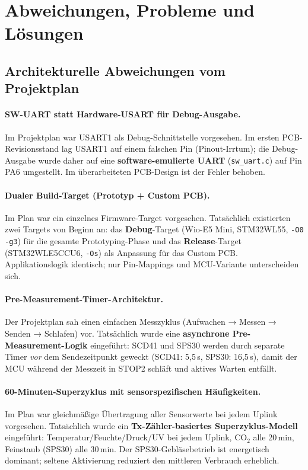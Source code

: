 \documentclass[11pt,a4paper]{scrartcl}
\begin{document}
\section{Abweichungen, Probleme und Lösungen}

\subsection*{Architekturelle Abweichungen vom Projektplan}

\paragraph{SW-UART statt Hardware-USART für Debug-Ausgabe.}
Im Projektplan war USART1 als Debug-Schnittstelle vorgesehen. Im ersten PCB-Revisionsstand lag USART1 auf einem falschen Pin (Pinout-Irrtum); die Debug-Ausgabe wurde daher auf eine \textbf{software-emulierte UART} (\texttt{sw\_uart.c}) auf Pin PA6 umgestellt. Im überarbeiteten PCB-Design ist der Fehler behoben.

\paragraph{Dualer Build-Target (Prototyp + Custom PCB).}
Im Plan war ein einzelnes Firmware-Target vorgesehen. Tatsächlich existierten zwei Targets von Beginn an: das \textbf{Debug}-Target (Wio-E5 Mini, STM32WL55, \texttt{-O0 -g3}) für die gesamte Prototyping-Phase und das \textbf{Release}-Target (STM32WLE5CCU6, \texttt{-Os}) als Anpassung für das Custom PCB. Applikationslogik identisch; nur Pin-Mappings und MCU-Variante unterscheiden sich.

\paragraph{Pre-Measurement-Timer-Architektur.}
Der Projektplan sah einen einfachen Messzyklus (Aufwachen → Messen → Senden → Schlafen) vor. Tatsächlich wurde eine \textbf{asynchrone Pre-Measurement-Logik} eingeführt: SCD41 und SPS30 werden durch separate Timer \textit{vor} dem Sendezeitpunkt geweckt (SCD41: 5,5\,s, SPS30: 16,5\,s), damit der MCU während der Messzeit in STOP2 schläft und aktives Warten entfällt.

\paragraph{60-Minuten-Superzyklus mit sensorspezifischen Häufigkeiten.}
Im Plan war gleichmäßige Übertragung aller Sensorwerte bei jedem Uplink vorgesehen. Tatsächlich wurde ein \textbf{Tx-Zähler-basiertes Superzyklus-Modell} eingeführt: Temperatur/Feuchte/Druck/UV bei jedem Uplink, CO$_2$ alle 20\,min, Feinstaub (SPS30) alle 30\,min. Der SPS30-Gebläsebetrieb ist energetisch dominant; seltene Aktivierung reduziert den mittleren Verbrauch erheblich.
\end{document}
